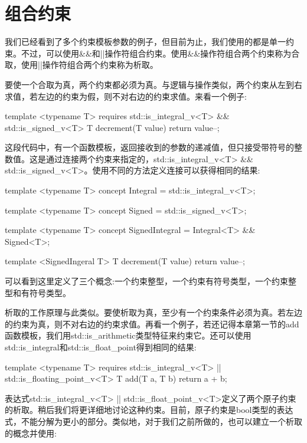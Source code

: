 \section{组合约束}

我们已经看到了多个约束模板参数的例子，但目前为止，我们使用的都是单一约束。不过，可以使用\&\&和||操作符组合约束。使用\&\&操作符组合两个约束称为合取，使用||操作符组合两个约束称为析取。

要使一个合取为真，两个约束都必须为真。与逻辑与操作类似，两个约束从左到右求值，若左边的约束为假，则不对右边的约束求值。来看一个例子:

\begin{cpp}
template <typename T>
requires std::is_integral_v<T> && std::is_signed_v<T>
T decrement(T value)
{
	return value--;
}
\end{cpp}

这段代码中，有一个函数模板，返回接收到的参数的递减值，但只接受带符号的整数值。这是通过连接两个约束来指定的，std::is\_integral\_v<T> \&\& std::is\_signed\_v<T>。使用不同的方法定义连接可以获得相同的结果:

\begin{cpp}
template <typename T>
concept Integral = std::is_integral_v<T>;

template <typename T>
concept Signed = std::is_signed_v<T>;

template <typename T>
concept SignedIntegral = Integral<T> && Signed<T>;

template <SignedIngeral T>
T decrement(T value)
{
	return value--;
}
\end{cpp}

可以看到这里定义了三个概念:一个约束整型，一个约束有符号类型，一个约束整型和有符号类型。

析取的工作原理与此类似。要使析取为真，至少有一个约束条件必须为真。若左边的约束为真，则不对右边的约束求值。再看一个例子，若还记得本章第一节的add函数模板，我们用std::is\_arithmetic类型特征来约束它。还可以使用std::is\_integral和std::is\_float\_point得到相同的结果:

\begin{cpp}
template <typename T>
requires std::is_integral_v<T> || std::is_floating_point_v<T>
T add(T a, T b)
{
	return a + b;
}
\end{cpp}

表达式std::is\_integral\_v<T> || std::is\_float\_point\_v<T>定义了两个原子约束的析取。稍后我们将更详细地讨论这种约束。目前，原子约束是bool类型的表达式，不能分解为更小的部分。类似地，对于我们之前所做的，也可以建立一个析取的概念并使用:

